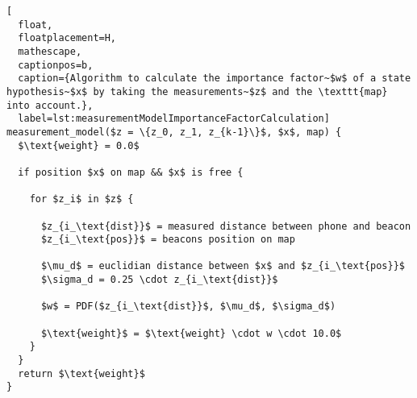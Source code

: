 \begin{lstlisting}[
  float,
  floatplacement=H,
  mathescape,
  captionpos=b,
  caption={Algorithm to calculate the importance factor~$w$ of a state hypothesis~$x$ by taking the measurements~$z$ and the \texttt{map} into account.},
  label=lst:measurementModelImportanceFactorCalculation]
measurement_model($z = \{z_0, z_1, z_{k-1}\}$, $x$, map) {
  $\text{weight} = 0.0$

  if position $x$ on map && $x$ is free {

    for $z_i$ in $z$ {

      $z_{i_\text{dist}}$ = measured distance between phone and beacon
      $z_{i_\text{pos}}$ = beacons position on map

      $\mu_d$ = euclidian distance between $x$ and $z_{i_\text{pos}}$
      $\sigma_d = 0.25 \cdot z_{i_\text{dist}}$

      $w$ = PDF($z_{i_\text{dist}}$, $\mu_d$, $\sigma_d$)

      $\text{weight}$ = $\text{weight} \cdot w \cdot 10.0$
    }
  }
  return $\text{weight}$
}
\end{lstlisting}
